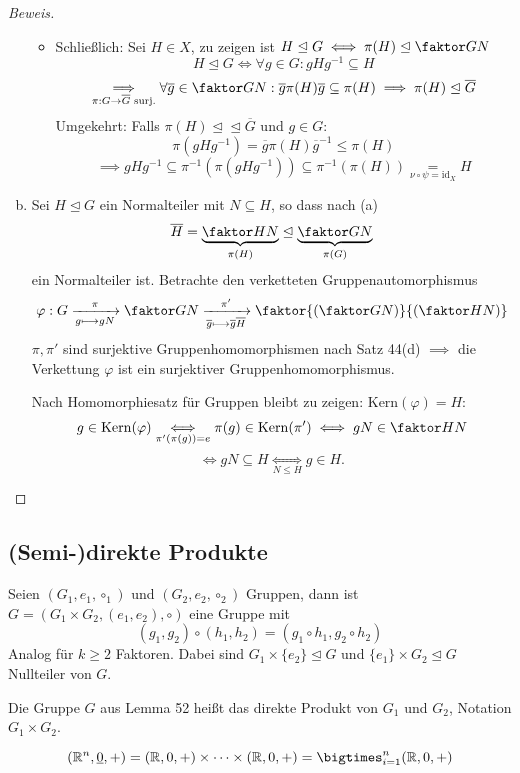 \documentclass[a4paper]{report}
\begin{document}
\begin{satz}
\begin{proof}[Beweis]
\begin{enumerate}[(a)]
\begin{itemize}
  \item Schließlich: Sei $H \in X$, zu zeigen ist $H \trianglelefteq G \iff \pi(H) \trianglelefteq \faktor GN$
        $$H \trianglelefteq G \iff \forall g \in G : gHg^{-1} \subseteq H$$
        $$\underset{\pi: G \to \overline G \text{ surj.}}\implies \forall \overline g \in \faktor GN: \overline g \pi(H)\overline g \subseteq \pi(H) \implies \pi(H) \trianglelefteq \overline G$$
        Umgekehrt: Falls $\pi(H) \trianglelefteq \trianglelefteq \overline G$ und $g \in G$:
        $$\pi(gHg^{-1}) = \overline g\pi(H)\overline g^{-1} \le \pi(H)$$
        $$\implies gHg^{-1} \subseteq \pi^{-1}(\pi(gHg^{-1})) \subseteq \pi^{-1}(\pi(H)) \underset{\nu \circ \psi = \mathrm{id}_{X}} = H$$
\end{itemize}
    \item Sei $H \trianglelefteq G$ ein Normalteiler mit $N \subseteq H$, so dass nach (a)
          $$\overline H = \underbrace{\faktor HN}_{\pi(H)} \trianglelefteq \underbrace{\faktor GN}_{\pi(G)}$$
          ein Normalteiler ist. Betrachte den verketteten Gruppenautomorphismus
          $$\varphi : G \xrightarrow[g \longmapsto gN]{\pi}\faktor GN \xrightarrow[\overline g \longmapsto \overline g \overline H]{\pi'} \faktor{\left(\faktor GN\right)}{\left(\faktor HN\right)}$$
          $\pi, \pi'$ sind surjektive Gruppenhomomorphismen nach Satz 44(d) $\implies$ die Verkettung $\varphi$ ist ein surjektiver Gruppenhomomorphismus.

          Nach Homomorphiesatz für Gruppen bleibt zu zeigen: $\mathrm{Kern}(\varphi) = H$:
          $$g \in \mathrm{Kern}(\varphi) \underset{\pi'(\pi(g))=e}\iff\pi(g) \in \mathrm{Kern}(\pi') \iff gN \in \faktor HN$$
          $$\iff gN \subseteq H \underset{N \le H}\iff g \in H.$$
  \end{enumerate}
\end{proof}
\end{satz}

\subsection*{(Semi-)direkte Produkte}%
\label{sec:Direkte Produkte}
\begin{lemm}[Übung]
  Seien $(G_{1}, e_{1}, \circ_{1})$ und $(G_{2}, e_{2}, \circ_{2})$ Gruppen, dann ist $G = (G_{1} \times G_{2}, (e_{1}, e_{2}), \circ)$ eine Gruppe mit
  $$(g_{1}, g_{2}) \circ (h_{1}, h_{2}) = (g_{1} \circ h_{1}, g_{2} \circ h_{2})$$
  Analog für $k \ge 2$ Faktoren. Dabei sind $G_{1} \times \{e_{2}\} \trianglelefteq G$ und $\{e_{1}\} \times G_{2} \trianglelefteq G$ Nullteiler von $G$.
\end{lemm}
\begin{defi} Die Gruppe $G$ aus Lemma 52 heißt das direkte Produkt von $G_{1}$ und $G_{2}$, Notation $G_{1} \times G_{2}$.
\end{defi}
\begin{bsp*}
$$(\Bbb R^{n}, \underline 0, +) = (\Bbb R, 0, +) \times \cdots \times (\Bbb R, 0, +) = \bigtimes_{i = 1}^{n}(\Bbb R, 0, +)$$
\end{bsp*}
\end{document}

